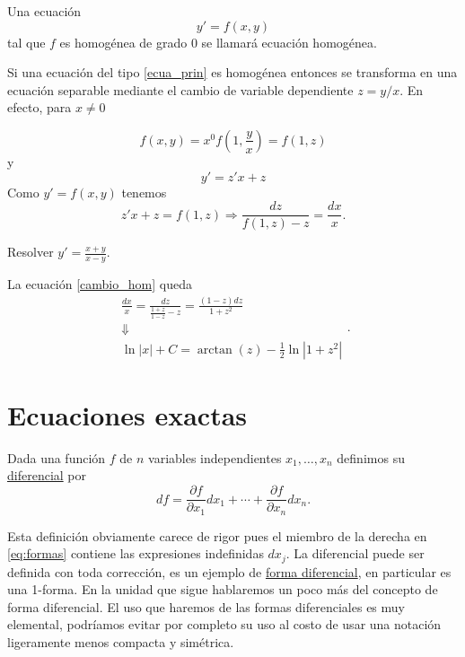 \begin{definicion}
 Una ecuación
 \begin{equation}\label{ecua_prin}y'=f(x,y)\end{equation}
 tal que $f$ es homogénea de grado $0$ se llamará ecuación homogénea.
\end{definicion}

Si una ecuación del tipo \eqref{ecua_prin} es homogénea entonces se transforma en una ecuación separable mediante el cambio de variable dependiente $\boxed{z=y/x}$. En efecto, para $x\neq 0$

\[f(x,y)=x^0f\left(1,\frac{y}{x}\right)=f(1,z)\]
y
\[y'=z'x+z\]
Como $y'=f(x,y)$ tenemos
\begin{equation}\label{cambio_hom}z'x+z=f(1,z)\Longrightarrow \frac{dz}{f(1,z)-z}=\frac{dx}{x}.\end{equation}



\begin{ejemplo} Resolver $y'=\frac{x+y}{x-y}$.

La ecuación \eqref{cambio_hom} queda
\[ \begin{array}{c} \frac{dx}{x}=\frac{dz}{\frac{1+z}{1-z}-z}=\frac{(1-z)dz}{1+z^2}\\
 \Downarrow\\
\ln|x|+C=\arctan(z)-\frac{1}{2}\ln|1+z^2|
    \end{array}.
\]

\end{ejemplo}



\section{Ecuaciones exactas}



\begin{definicion}[Diferencial]
 Dada una función $f$ de $n$ variables independientes $x_1,\ldots,x_n$ definimos su \href{http://es.wikipedia.org/wiki/Diferencial_de_una_función}{diferencial}
 por
 \begin{equation}\label{eq:formas} df=\frac{\partial f}{\partial x_1}dx_1+\cdots +\frac{\partial f}{\partial x_n}dx_n.
   \end{equation}

 \end{definicion}

 Esta definición obviamente carece de rigor pues el miembro de la derecha en \eqref{eq:formas} contiene las expresiones indefinidas $dx_j$.
La diferencial puede ser definida con toda corrección, es un ejemplo de \href{https://es.wikipedia.org/wiki/Forma_diferencial}{forma diferencial}\link, en particular  es una 1-forma. En la unidad que sigue hablaremos un poco más del concepto de forma diferencial. El uso que haremos de las formas diferenciales es muy elemental, podríamos evitar por completo su uso al costo de usar una notación ligeramente menos compacta y simétrica.

